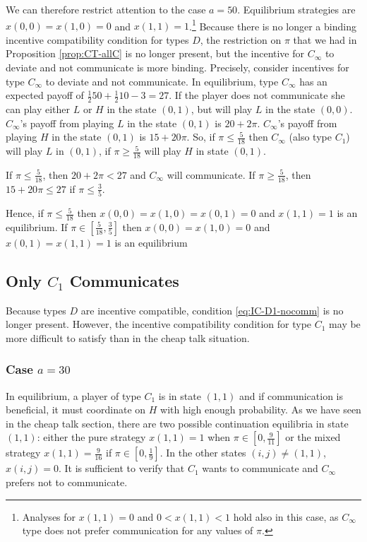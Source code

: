 \documentclass[12pt]{article}
\theoremstyle{definition}
\theoremstyle{remark}
\begin{document}
We can therefore restrict attention to the case $a=50$. Equilibrium strategies are $x(0,0)=x(1,0)=0$ and $x(1,1)=1$.\footnote{Analyses for $x(1,1)=0$ and $0<x(1,1)<1$ hold also in this case, as $C_\infty$ type does not prefer communication for any values of $\pi$.} Because there is no longer a binding incentive compatibility condition for types $D$, the restriction on $\pi$ that we had in Proposition \ref{prop:CT-allC} is no longer present, but the incentive for $C_\infty$ to deviate and not communicate is more binding. Precisely, consider incentives for type $C_\infty$ to deviate and not communicate. In equilibrium, type $C_\infty$ has an expected payoff of $\frac{1}{2}50+\frac{1}{2}10-3=27$. If the player does not communicate she can play either $L$ or $H$ in the state $(0,1)$, but will play $L$ in the state $(0,0)$. $C_\infty$'s payoff from playing $L$ in the state $(0,1)$ is $20+2\pi$. $C_\infty$'s payoff from playing $H$ in the state $(0,1)$ is $15+20\pi$. So, if $\pi\leq\frac{5}{18}$ then $C_\infty$ (also type $C_1$) will play $L$ in $(0,1)$, if $\pi\geq\frac{5}{18}$ will play $H$ in state $(0,1)$.

If $\pi\leq\frac{5}{18}$, then $20+2\pi<27$ and $C_\infty$ will communicate. If $\pi\geq\frac{5}{18}$, then $15+20\pi\leq 27$ if $\pi \leq \frac{3}{5}$.

Hence, if $\pi\leq\frac{5}{18}$ then $x(0,0)=x(1,0)=x(0,1)=0$ and $x(1,1)=1$ is an equilibrium. If $\pi\in\left[\frac{5}{18}, \frac{3}{5}\right]$ then $x(0,0)=x(1,0)=0$ and $x(0,1)=x(1,1)=1$ is an equilibrium

\subsection{Only $C_1$ Communicates}
Because types $D$ are incentive compatible, condition \eqref{eq:IC-D1-nocomm} is no longer present. However, the incentive compatibility condition for type $C_1$ may be more difficult to satisfy than in the cheap talk situation.


\subsubsection*{Case $a=30$} 
In equilibrium, a player of type $C_1$ is in state $(1,1)$ and if communication is beneficial, it must coordinate on $H$ with high enough probability. As we have seen in the cheap talk section, there are two possible continuation equilibria in state $(1,1)$: either the pure strategy $x(1,1)=1$ when $\pi\in\left[0, \frac{9}{11}\right]$ or the mixed strategy $x(1,1)=\frac{9}{16}$ if  $\pi\in\left[0, \frac{1}{9}\right]$. In the other states $(i,j)\neq (1,1)$, $x(i,j)=0$. It is sufficient to verify that $C_1$ wants to communicate and $C_\infty$ prefers not to communicate.
\end{document}
